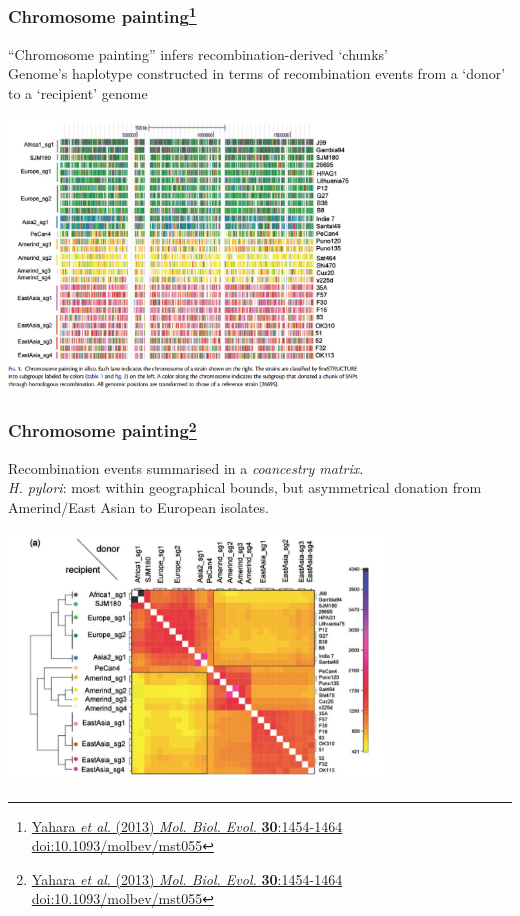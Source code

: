 \begin{frame}
  \frametitle{Chromosome painting\footnote{\tiny{\href{http://dx.doi.org/10.1093/molbev/mst055}{Yahara \textit{et al}. (2013) \textit{Mol. Biol. Evol.} \textbf{30}:1454-1464 doi:10.1093/molbev/mst055}}}}
  ``Chromosome painting'' infers recombination-derived `chunks'\\
  Genome's haplotype constructed in terms of recombination events from a `donor' to a `recipient' genome\\
  \begin{center}
    \includegraphics[width=0.7\textwidth]{images/chromosome_painting}
  \end{center}     
\end{frame}

\begin{frame}
  \frametitle{Chromosome painting\footnote{\tiny{\href{http://dx.doi.org/10.1093/molbev/mst055}{Yahara \textit{et al}. (2013) \textit{Mol. Biol. Evol.} \textbf{30}:1454-1464 doi:10.1093/molbev/mst055}}}}
  Recombination events summarised in a \textit{coancestry matrix}.\\
  \textit{H. pylori}: most within geographical bounds, but asymmetrical donation from Amerind/East Asian to European isolates.
  \begin{center}
    \includegraphics[width=0.75\textwidth]{images/coancestry}
  \end{center}     
\end{frame}